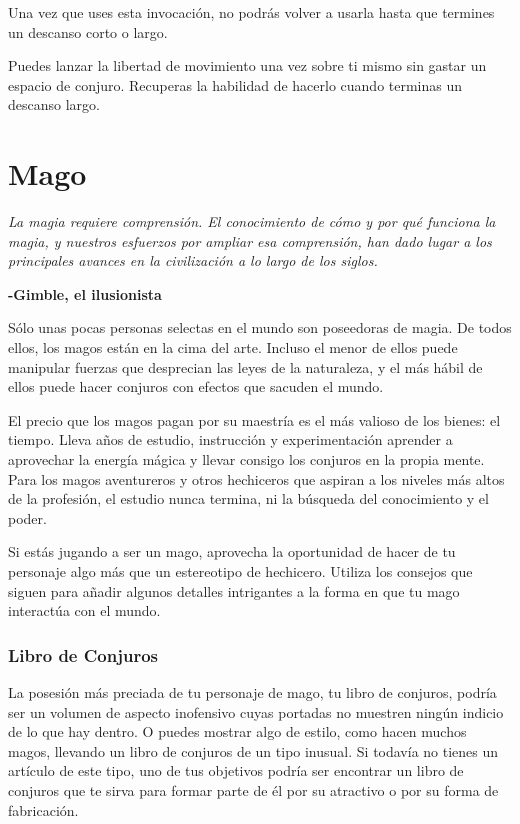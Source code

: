 \documentclass[a4paper,twocolumn,openany,10pt]{dndbook}
\begin{document}
Una vez que uses esta invocación, no podrás volver a usarla hasta que termines un descanso corto o largo.

Puedes lanzar la libertad de movimiento una vez sobre ti mismo sin gastar un espacio de conjuro. Recuperas la habilidad de
hacerlo cuando terminas un descanso largo. 

\section{Mago}
\begin{quotebox}
	\textit{La magia requiere comprensión. El conocimiento de cómo y por qué funciona la magia, y nuestros esfuerzos por ampliar
	esa comprensión, han dado lugar a los principales avances en la civilización a lo largo de los siglos.}

	\begin{flushright}
	\textbf{-Gimble, el ilusionista}
	\end{flushright}
\end{quotebox}

Sólo unas pocas personas selectas en el mundo son poseedoras de magia. De todos ellos, los magos están en la cima del arte.
Incluso el menor de ellos puede manipular fuerzas que desprecian las leyes de la naturaleza, y el más hábil de ellos puede hacer
conjuros con efectos que sacuden el mundo.

El precio que los magos pagan por su maestría es el más valioso de los bienes: el tiempo. Lleva años de estudio, instrucción y
experimentación aprender a aprovechar la energía mágica y llevar consigo los conjuros en la propia mente. Para los magos
aventureros y otros hechiceros que aspiran a los niveles más altos de la profesión, el estudio nunca termina, ni la búsqueda del
conocimiento y el poder.

Si estás jugando a ser un mago, aprovecha la oportunidad de hacer de tu personaje algo más que un estereotipo de hechicero.
Utiliza los consejos que siguen para añadir algunos detalles intrigantes a la forma en que tu mago interactúa con el mundo.  

\subsubsection*{Libro de Conjuros}
La posesión más preciada de tu personaje de mago, tu libro de conjuros, podría ser un volumen de aspecto inofensivo cuyas
portadas no muestren ningún indicio de lo que hay dentro. O puedes mostrar algo de estilo, como hacen muchos magos, llevando un
libro de conjuros de un tipo inusual. Si todavía no tienes un artículo de este tipo, uno de tus objetivos podría ser encontrar
un libro de conjuros que te sirva para formar parte de él por su atractivo o por su forma de fabricación. 
\end{document}
